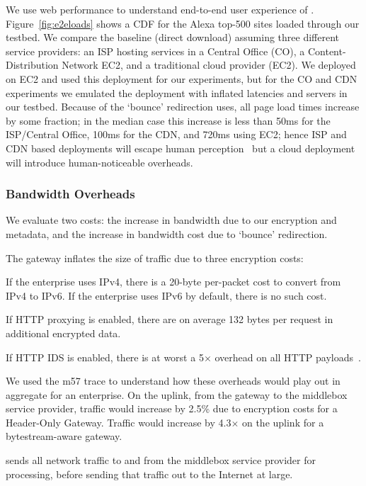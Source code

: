 We use web performance to understand end-to-end user experience of \sys.
Figure~\ref{fig:e2eloads} shows a CDF for the Alexa top-500 sites loaded through our testbed. We compare the baseline (direct download) assuming three different service providers: an ISP hosting services in a Central Office (CO), a Content-Distribution Network EC2, and a traditional cloud provider (EC2). We deployed \sys on EC2 and used this deployment for our experiments, but for the CO and CDN experiments we emulated the deployment with inflated latencies and servers in our testbed. 
Because of the `bounce' redirection \sys uses, all page load times increase by some fraction; in the median case this increase is less than 50ms for the ISP/Central Office, 100ms for the CDN, and 720ms using EC2; hence ISP and CDN based deployments will escape human perception~\cite{millishumans} but a cloud deployment will introduce human-noticeable overheads.

\subsubsection{Bandwidth Overheads}
We evaluate two costs: the increase in bandwidth due to our encryption and metadata, and the increase in bandwidth cost due to `bounce' redirection.

The gateway inflates the size of traffic due to three encryption costs:
\begin{myitemize}
  \item If the enterprise uses IPv4, there is a 20-byte per-packet cost to convert from IPv4 to IPv6. If the enterprise uses IPv6 by default, there is no such cost.
  \item If HTTP proxying is enabled, there are on average 132 bytes per request in additional encrypted data.
  \item If HTTP IDS is enabled, there is at worst a 5$\times$ overhead on all HTTP payloads~\cite{blindbox}.
\end{myitemize}
We used the m57 trace to understand how these overheads would play out in aggregate for an enterprise.
On the uplink, from the gateway to the middlebox service provider, traffic would increase by 2.5\% due to encryption costs for a Header-Only Gateway. Traffic would increase by 4.3$\times$ on the uplink for a bytestream-aware gateway. 


\sys sends all network traffic to and from the middlebox service provider for processing, before sending that traffic out to the Internet at large. 

